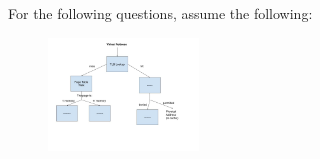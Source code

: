 \begin{blocksection}
\question For the following questions, assume the following:
\begin{figure}[http]
    \centering
    \includegraphics[width=4cm]{topics/virtualmemory/ChartQuestion.jpg}
    \label{fig:galaxy}
\end{figure}

\end{blocksection}